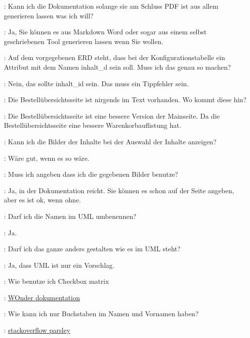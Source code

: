 \documentclass[a4paper, 11pt]{article}
\begin{document}
\begin{drama}

\msspeaks: Kann ich die Dokumentation solange sie am Schluss PDF ist aus allem generieren lassen was ich will?

\dozentspeaks: Ja, Sie können es aus Markdown Word oder sogar aus einem selbst geschriebenen Tool generieren lassen wenn Sie wollen.

\msspeaks: Auf dem vorgegebenen ERD steht, dass bei der Konfigurationstabelle ein Attribut mit dem Namen inhalt\_d sein soll. Muss ich das genau so machen?

\dozentspeaks: Nein, das sollte inhalt\_id sein. Das muss ein Tippfehler sein.

\msspeaks: Die Bestellübersichtsseite ist nirgends im Text vorhanden. Wo kommt diese hin?

\dozentspeaks: Die Bestellübersichtsseite ist eine bessere Version der Mainseite. Da die Bestellübersichtsseite eine bessere Warenkorbauflistung hat.

\msspeaks: Kann ich die Bilder der Inhalte bei der Auswahl der Inhalte anzeigen?

\dozentspeaks: Wäre gut, wenn es so wäre.

\msspeaks: Muss ich angeben dass ich die gegebenen Bilder benutze?

\dozentspeaks: Ja, in der Dokumentation reicht. Sie können es schon auf der Seite angeben, aber es ist ok, wenn ohne.

\msspeaks: Darf ich die Namen im UML umbenennen?

\dozentspeaks: Ja.

\msspeaks: Darf ich das ganze anders gestalten wie es im UML steht?

\dozentspeaks: Ja, dass UML ist nur ein Vorschlag.

\msspeaks: Wie benutze ich Checkbox matrix

\internetspeaks: \href{https://github.com/wocommunity/wonder/blob/4d7f6bf9236c3005359101d6f3c9e6224d47750e/Frameworks/Core/JavaWOExtensions/Sources/com/webobjects/woextensions/WOCheckboxMatrix.java}{WOnder dokumentation}

\msspeaks: Wie kann ich nur Buchstaben im Namen und Vornamen haben?

\internetspeaks: \href{https://stackoverflow.com/questions/23415795/how-to-only-allow-text-in-parsely-js-validation}{stackoverflow parsley}


\end{drama}
\end{document}

